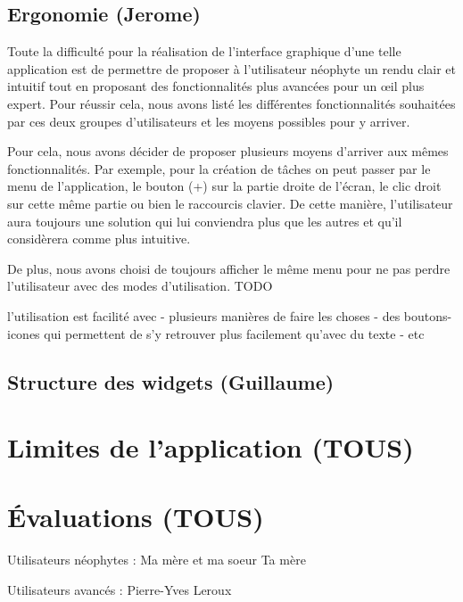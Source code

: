	\section{Ergonomie (Jerome)}
		Toute la difficulté pour la réalisation de l'interface graphique d'une telle application est de permettre de proposer à l'utilisateur néophyte un rendu clair et intuitif tout en proposant des fonctionnalités plus avancées pour un {\oe}il plus expert. Pour réussir cela, nous avons listé les différentes fonctionnalités souhaitées par ces deux groupes d'utilisateurs et les moyens possibles pour y arriver.
		
		Pour cela, nous avons décider de proposer plusieurs moyens d'arriver aux mêmes fonctionnalités. Par exemple, pour la création de tâches on peut passer par le menu de l'application, le bouton (+) sur la partie droite de l'écran, le clic droit sur cette même partie ou bien le raccourcis clavier. De cette manière, l'utilisateur aura toujours une solution qui lui conviendra plus que les autres et qu'il considèrera comme plus intuitive.
		
		De plus, nous avons choisi de toujours afficher le même menu pour ne pas perdre l'utilisateur avec des \og modes \fg d'utilisation. TODO
		
		l'utilisation est facilité avec
			- plusieurs manières de faire les choses
			- des boutons-icones qui permettent de s'y retrouver plus facilement qu'avec du texte
			- etc
				
	\section{Structure des widgets (Guillaume)}
		
		
	
\chapter{Limites de l'application (TOUS)}
	


\chapter{Évaluations (TOUS)}
	
	Utilisateurs néophytes :
		Ma mère et ma soeur
		Ta mère
		
	Utilisateurs avancés :
		Pierre-Yves
		Leroux

